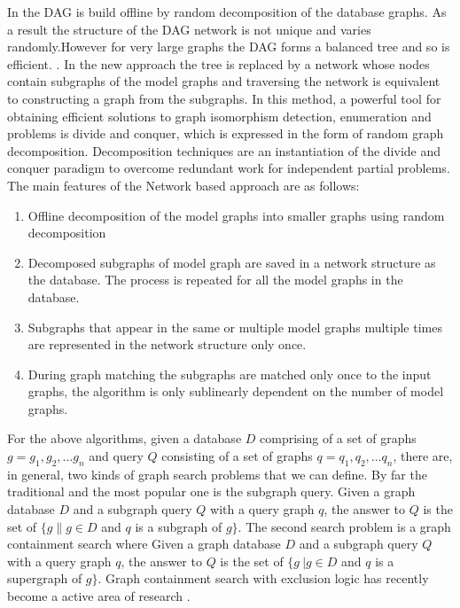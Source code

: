 In \cite{messmer_bunke2000} the DAG is build offline by random decomposition of the database graphs. As a result the structure of the DAG network is not unique and varies randomly.However for very large graphs the DAG forms a balanced tree and so is efficient.  
 . In the new approach the tree is replaced by a network whose nodes contain subgraphs of the model graphs and traversing the 
network is equivalent to constructing a graph from the subgraphs. In this method, a powerful tool for obtaining efficient solutions to graph isomorphism 
detection, enumeration  and  problems is divide and conquer, which is expressed in the form of random graph decomposition. Decomposition techniques are 
an instantiation of the divide and conquer paradigm to overcome redundant work for independent partial problems. The main features of the Network based 
approach are as follows:

\begin{enumerate}
\item Offline decomposition of the model graphs into smaller graphs using  random decomposition
\item Decomposed subgraphs of model graph are saved in a network structure as the database. The process is repeated for all the model graphs in the database.
\item Subgraphs that appear in the same or multiple model graphs multiple times are represented in the network structure only once.
\item During graph matching the subgraphs are matched only once to the input graphs, the algorithm is only sublinearly dependent on the number of model graphs.
\end{enumerate}

For the above algorithms, given a database $D$ comprising of a set of graphs $g=g_1 ,g_2 ,\ldots g_n$ and query $Q$ consisting of a set of graphs 
$q=q_1 ,q_2 ,\ldots q_n$, there are, in general, two kinds of graph search problems that we can define. By far the traditional and the most popular 
one is the subgraph query. Given a graph database $D$ and a subgraph query $Q$ with  a query graph $q$, the answer to $Q$ is the set of $\{g \| g\in D$ 
and $q$ is a subgraph of $g\} $. The second search problem is a graph containment search where Given a graph database $D$ and a subgraph query $Q$ with  
a query graph $q$, the answer to $Q$ is the set of $\{g\ | g\in D$ and $q$ is a supergraph of $g\}$. Graph containment search with exclusion logic has 
recently become a  active area of research \cite{chen2007_cindex} \cite{zhang_gao_wu2011}.  
 

